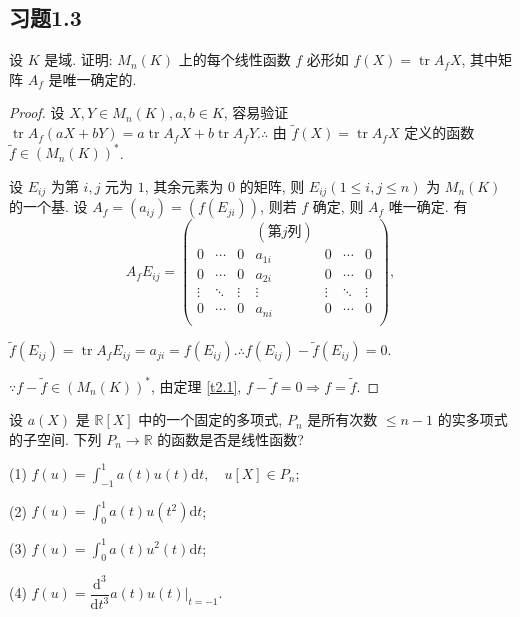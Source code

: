 \documentclass{ctexart}
\begin{document}
\subsection{习题1.3}
\begin{exercise}\label{ex3.1}
    设 $K$ 是域. 证明: $M_n(K)$ 上的每个线性函数 $f$ 必形如 $f(X)=\operatorname{tr}A_fX$, 其中矩阵 $A_f$ 是唯一确定的.
\end{exercise}
\begin{proof}
    设 $X,Y\in M_n(K),a,b\in K$, 容易验证 $\operatorname{tr}A_f(aX+bY)=a\operatorname{tr}A_fX+b\operatorname{tr}A_fY.\therefore$ 由 $\tilde{f}(X)=\operatorname{tr}A_fX$ 定义的函数 $\tilde{f}\in(M_n(K))^*$.

    设 $E_{ij}$ 为第 $i,j$ 元为 $1$, 其余元素为 $0$ 的矩阵, 则 $E_{ij}(1\leq i,j\leq n)$ 为 $M_n(K)$ 的一个基. 设 $A_f=(a_{ij})=(f(E_{ji}))$, 则若 $f$ 确定, 则 $A_f$ 唯一确定. 有
    \[A_fE_{ij}=\begin{pmatrix}
               &        &        & (\text{第}j\text{列}) \\
        0      & \cdots & 0      & a_{1i} & 0      & \cdots & 0 \\
        0      & \cdots & 0      & a_{2i} & 0      & \cdots & 0 \\
        \vdots & \ddots & \vdots & \vdots & \vdots & \ddots & \vdots \\
        0      & \cdots & 0      & a_{ni} & 0      & \cdots & 0 \\
    \end{pmatrix},\]

    $\tilde{f}(E_{ij})=\operatorname{tr}A_fE_{ij}=a_{ji}=f(E_{ij}).\therefore f(E_{ij})-\tilde{f}(E_{ij})=0$.
    
    $\because f-\tilde{f}\in(M_n(K))^*$, 由定理 \ref{t2.1}, $f-\tilde{f}=0\Rightarrow f=\tilde{f}$.
\end{proof}
\begin{exercise}%
    设 $a(X)$ 是 $\mathbb{R}[X]$ 中的一个固定的多项式, $P_n$ 是所有次数 $\leq n-1$ 的实多项式的子空间. 下列 $P_n\to\mathbb{R}$ 的函数是否是线性函数?

    (1) $f(u)=\int_{-1}^1a(t)u(t)\mathrm{d}t,\quad u[X]\in P_n$;

    (2) $f(u)=\int_0^1a(t)u(t^2)\mathrm{d}t$;

    (3) $f(u)=\int_0^1a(t)u^2(t)\mathrm{d}t$;

    (4) $f(u)=\dfrac{\mathrm{d}^3}{\mathrm{d}t^3}a(t)u(t)\Big|_{t=-1}$.
\end{exercise}
\end{document}
